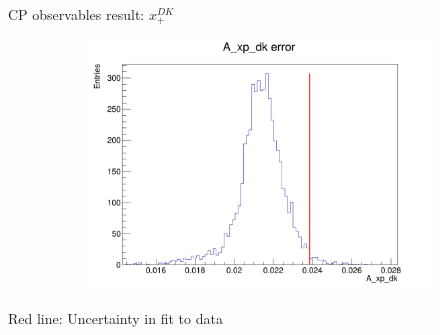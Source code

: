 \documentclass{beamer}
\begin{document}
\begin{frame}{CP observables result: $x_+^{DK}$}
\begin{figure}
\begin{subfigure}{0.42\textwidth}
      \includegraphics[width = 1.0\textwidth]{Plots/A_xp_dk_error_WithDataUncertainty.png}
    \end{subfigure}
  \end{figure}
  \begin{center}
    Red line: Uncertainty in fit to data
  \end{center}
\end{frame}
\end{document}
